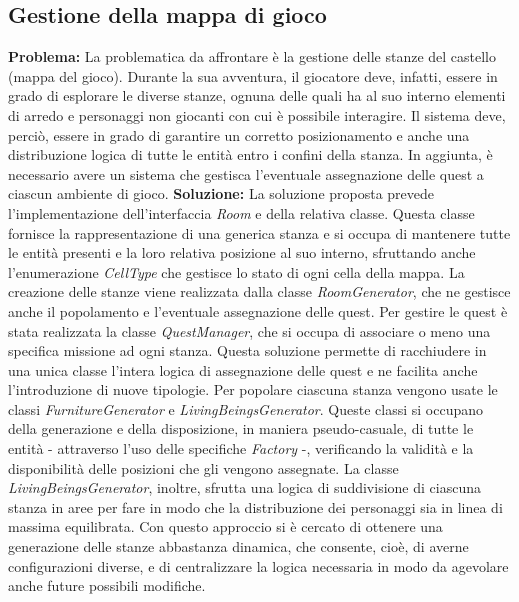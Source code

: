 \documentclass[a4paper,12pt]{report}
\begin{document}
\subsection{\textbf{Gestione della mappa di gioco}}
\textbf{Problema:} La problematica da affrontare è la gestione delle stanze del castello (mappa del gioco).
Durante la sua avventura, il giocatore deve, infatti, essere in grado di esplorare le diverse stanze, ognuna delle quali 
ha al suo interno elementi di arredo e personaggi non giocanti con cui è possibile interagire.
Il sistema deve, perciò, essere in grado di garantire un corretto posizionamento e anche una distribuzione logica di tutte le entità entro i confini della stanza.
In aggiunta, è necessario avere un sistema che gestisca l'eventuale assegnazione delle quest a ciascun ambiente di gioco.\newline
\textbf{Soluzione:} La soluzione proposta prevede l'implementazione dell'interfaccia \textit{Room} e della relativa classe.
Questa classe fornisce la rappresentazione di una generica stanza e si occupa di mantenere tutte le entità presenti e la loro relativa posizione al suo interno, sfruttando anche
l'enumerazione \textit{CellType} che gestisce lo stato di ogni cella della mappa.
La creazione delle stanze viene realizzata dalla classe \textit{RoomGenerator}, che ne gestisce anche il popolamento e l'eventuale assegnazione delle quest.
Per gestire le quest è stata realizzata la classe \textit{QuestManager}, che si occupa di associare o meno una specifica missione ad ogni stanza.
Questa soluzione permette di racchiudere in una unica classe l'intera logica di assegnazione delle quest e ne facilita anche l'introduzione di nuove tipologie.
Per popolare ciascuna stanza vengono usate le classi \textit{FurnitureGenerator} e \textit{LivingBeingsGenerator}.
Queste classi si occupano della generazione e della disposizione, in maniera pseudo-casuale, di tutte le entità - attraverso l'uso delle specifiche \textit{Factory} -, verificando la validità e la disponibilità
delle posizioni che gli vengono assegnate. La classe \textit{LivingBeingsGenerator}, inoltre, sfrutta una logica di suddivisione di ciascuna stanza in aree per fare in modo che la 
distribuzione dei personaggi sia in linea di massima equilibrata.
Con questo approccio si è cercato di ottenere una generazione delle stanze abbastanza dinamica, che consente, cioè, di averne configurazioni diverse, 
e di centralizzare la logica necessaria in modo da agevolare anche future possibili modifiche.\newline
\end{document}
